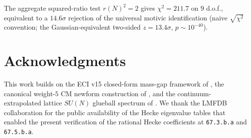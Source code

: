 \documentclass[11pt,a4paper]{amsart}
\theoremstyle{definition}
\begin{document}
The aggregate squared-ratio test $r(N)^{2}=2$ gives $\chi^{2} = 211.7$ on
$9$ d.o.f., equivalent to a $14.6\sigma$ rejection of the universal
motivic identification (naive $\sqrt{\chi^{2}}$ convention; the
Gaussian-equivalent two-sided $z = 13.4\sigma$, $p \sim 10^{-40}$).

\section*{Acknowledgments}

This work builds on the ECI v15 closed-form mass-gap framework of
\cite{ThmC6FN}, the canonical weight-$5$ CM newform construction of
\cite{HodgeFourfolds}, and the continuum-extrapolated lattice $SU(N)$ glueball
spectrum of \cite{AthenodorouTeper2021}. We thank the LMFDB collaboration for
the public availability of the Hecke eigenvalue tables that enabled the present
verification of the rational Hecke coefficients at \texttt{67.3.b.a} and
\texttt{67.5.b.a}.
\end{document}

